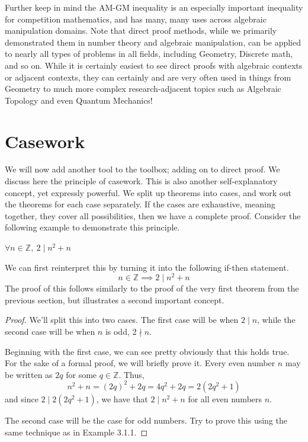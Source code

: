 Further keep in mind the AM-GM inequality is an especially important inequality for competition mathematics, and has many, many uses across algebraic manipulation domains. Note that direct proof methods, while we primarily demonstrated them in number theory and algebraic manipulation, can be applied to nearly all types of problems in all fields, including Geometry, Discrete math, and so on. While it is certainly easiest to see direct proofs with algebraic contexts or adjacent contexts, they can certainly and are very often used in things from Geometry to much more complex research-adjacent topics such as Algebraic Topology and even Quantum Mechanics!













\section{Casework}

We will now add another tool to the toolbox; adding on to direct proof. We discuss here the principle of casework. This is also another self-explanatory concept, yet expressly powerful. We split up theorems into cases, and work out the theorems for each case separately. If the cases are exhaustive, meaning together, they cover all possibilities, then we have a complete proof. Consider the following example to demonstrate this principle.

\begin{example}
$\forall n \in \mathbb{Z}, ~ 2 \mid n^2 + n$
\end{example}

We can first reinterpret this by turning it into the following if-then statement. 
\[ n \in \mathbb{Z} \implies 2 \mid n^2 + n\]
The proof of this follows similarly to the proof of the very first theorem from the previous section, but illustrates a second important concept.

\begin{proof}
We'll split this into two cases. The first case will be when $2 \mid n$, while the second case will be when $n$ is odd, $2 \nmid n$. 

Beginning with the first case, we can see pretty obviously that this holds true. For the sake of a formal proof, we will briefly prove it. Every even number $n$ may be written as $2q$ for some $q \in \mathbb{Z}$. Thus, 
\[n^2 + n = (2q)^2 + 2q = 4q^2 + 2q = 2(2q^2+1)\]
and since $2 \mid 2(2q^2+1)$, we have that $2 \mid n^2 + n$ for all even numbers $n$.

The second case will be the case for odd numbers. Try to prove this using the same technique as in Example 3.1.1. 
\end{proof}

